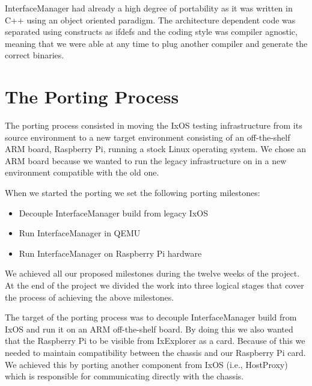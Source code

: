 InterfaceManager had already a high degree of portability as it was written
in C++ using an object oriented paradigm. The architecture dependent code was
separated using constructs as ifdefs and the coding style was compiler agnostic,
meaning that we were able at any time to plug another compiler and generate the
correct binaries.

\section{The Porting Process}

The porting process consisted in moving the IxOS testing infrastructure from its
source environment to a new target environment consisting of an off-the-shelf
ARM board, Raspberry Pi, running a stock Linux operating system. We chose an ARM
board because we wanted to run the legacy infrastructure on in a new environment
compatible with the old one.

When we started the porting we set the following porting milestones:
\begin{itemize}
    \item Decouple InterfaceManager build from legacy IxOS
    \item Run InterfaceManager in QEMU
    \item Run InterfaceManager on Raspberry Pi hardware
\end{itemize}
We achieved all our proposed milestones during the twelve weeks of the project.
At the end of the project we divided the work into three logical stages
that cover the process of achieving the above milestones.

The target of the porting process was to decouple InterfaceManager build from
IxOS and run it on an ARM off-the-shelf board. By doing this we also wanted that
the Raspberry Pi to be visible from IxExplorer as a card. Because of this we
needed to maintain compatibility between the chassis and our Raspberry Pi card.
We achieved this by porting another component from IxOS (i.e., HostProxy) which
is responsible for communicating directly with the chassis.


